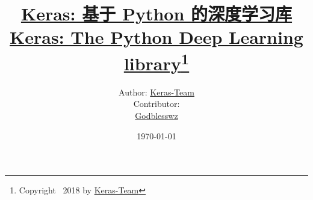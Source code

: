 \documentclass[11pt,a4paper,titlepage]{ctexart}
\begin{document}

\title{\huge \href{https://github.com/Godblesswz/keras-docs-zh}{Keras: 基于 Python 的深度学习库 \\ Keras: The Python Deep Learning library}\thanks{Copyright \textcopyright\ 2018 by \href{https://github.com/keras-team}{Keras-Team}}\vspace{0.7cm}}
\author{\Large Author: \href{https://github.com/keras-team}{Keras-Team}\vspace{0.2cm}\\
Contributor: \Large{} \vspace{0.2cm}\\
{\color{blue}\faGithub}\hspace{0.1cm} {\href{https://github.com/Godblesswz}{Godblesswz}}\\
{\color{blue}\faEnvelopeO} 
\vspace{0.6cm}}
\date{\today}

\maketitle






\begingroup    %
\tableofcontents %
\endgroup
\clearpage
{}%
\end{document}

